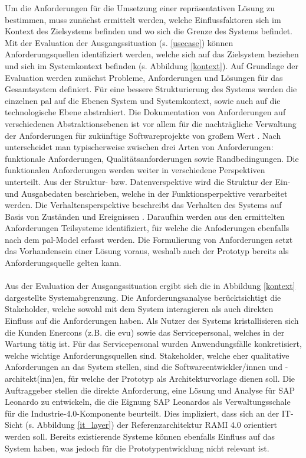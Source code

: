 Um die Anforderungen für die Umsetzung einer repräsentativen Lösung zu bestimmen, muss zunächst ermittelt werden, welche Einflussfaktoren sich im Kontext des Zielsystems befinden und wo sich die Grenze des Systems befindet. Mit der Evaluation der Ausgangssituation (s. \ref{usecase}) können Anforderungsquellen identifiziert werden, welche sich auf das Zielsystem beziehen und sich im Systemkontext befinden (s. Abbildung \ref{kontext}). Auf Grundlage der Evaluation werden zunächst Probleme, Anforderungen und Lösungen für das Gesamtsystem definiert. Für eine bessere Strukturierung des Systems werden die einzelnen \ac{pal} auf die Ebenen System und Systemkontext, sowie auch auf die technologische Ebene abstrahiert. Die Dokumentation von Anforderungen auf verschiedenen Abstraktionsebenen ist vor allem für die nachträgliche Verwaltung der Anforderungen für zukünftige Softwareprojekte von großem Wert \citep{Lauenroth2016}. Nach \citet{IREB2017} unterscheidet man typischerweise zwischen drei Arten von Anforderungen: funktionale Anforderungen, Qualitätsanforderungen sowie Randbedingungen. Die funktionalen Anforderungen werden weiter in verschiedene Perspektiven unterteilt. Aus der Struktur- bzw. Datenverspektive wird die Struktur der Ein- und Ausgabedaten beschrieben, welche in der Funktionsperpektive verarbeitet werden. Die Verhaltensperspektive beschreibt das Verhalten des Systems auf Basis von Zuständen und Ereignissen \citep{Lauenroth2016}.
Daraufhin werden aus den ermittelten Anforderungen Teilsysteme identifiziert, für welche die Anfoderungen ebenfalls nach dem \ac{pal}-Model erfasst werden. Die Formulierung von Anforderungen setzt das Vorhandensein einer Lösung voraus, weshalb auch der Prototyp bereits als Anforderungsquelle gelten kann.
\\\\Aus der Evaluation der Ausgangssituation ergibt sich die in Abbildung \ref{kontext} dargestellte Systemabgrenzung. Die Anforderungsanalyse berücktsichtigt die Stakeholder, welche sowohl mit dem System interagieren als auch direkten Einfluss auf die Anforderungen haben. Als Nutzer des Systems kristallisieren sich die Kunden Enercons (z.B. die \ac{evu}) sowie das Servicepersonal, welches in der Wartung tätig ist. Für das Servicepersonal wurden Anwendungsfälle konkretisiert, welche wichtige Anforderungsquellen sind. Stakeholder, welche eher qualitative Anforderungen an das System stellen, sind die Softwareentwickler/innen und -architekt(inn)en, für welche der Prototyp als Architekturvorlage dienen soll. Die Auftraggeber stellen die direkte Anforderung, eine Lösung und Analyse für SAP Leonardo zu entwickeln, die die Eignung SAP Leonardos als Verwaltungsschale für die Industrie-4.0-Komponente beurteilt. Dies impliziert, dass sich an der IT-Sicht (s. Abbildung \ref{it_layer}) der Referenzarchitektur RAMI 4.0 orientiert werden soll. Bereits existierende Systeme können ebenfalls Einfluss auf das System haben, was jedoch für die Prototypentwicklung nicht relevant ist.


